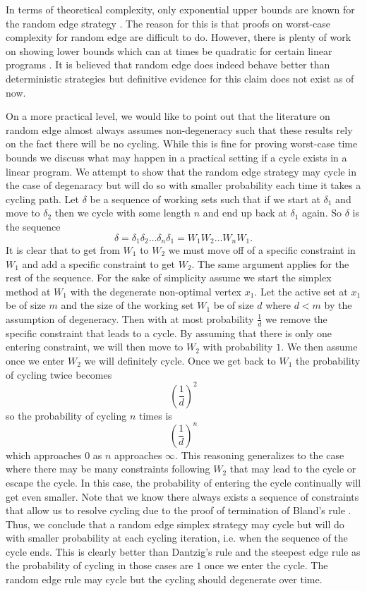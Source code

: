 \documentclass{standalone}
\begin{document}
{  In terms of theoretical complexity, only exponential upper bounds are known for the random edge strategy \cite{hansen2014improved} \cite{gartner2007two}. The reason for this is that proofs on worst-case complexity for random edge are difficult to do. However, there is plenty of work on showing lower bounds which can at times be quadratic for certain linear programs \cite{hansen2014improved}. It is believed that random edge does indeed behave better than deterministic strategies but definitive evidence for this claim does not exist as of now.\par
  On a more practical level, we would like to point out that the literature on random edge almost always assumes non-degeneracy such that these results rely on the fact there will be no cycling. While this is fine for proving worst-case time bounds we discuss what may happen in a practical setting if a cycle exists in a linear program. We attempt to show that the random edge strategy may cycle in the case of degenaracy but will do so with smaller probability each time it takes a cycling path. Let $\delta$ be a sequence of working sets such that if we start at $\delta_{1}$ and move to $\delta_{2}$ then we cycle with some length $n$ and end up back at $\delta_{1}$ again. So $\delta$ is the sequence
  \[
    \delta=\delta_{1}\delta_{2}\dots\delta_{n}\delta_{1}=W_{1}W_{2}\dots W_{n}W_{1}.
  \]
  It is clear that to get from $W_{1}$ to $W_{2}$ we must move off of a specific constraint in $W_{1}$ and add a specific constraint to get $W_{2}$. The same argument applies for the rest of the sequence. For the sake of simplicity assume we start the simplex method at $W_{1}$ with the degenerate non-optimal vertex $x_{1}$. Let the active set at $x_{1}$ be of size $m$ and the size of the working set $W_{1}$ be of size $d$ where $d<m$ by the assumption of degeneracy. Then with at most probability $\frac{1}{d}$ we remove the specific constraint that leads to a cycle. By assuming that there is only one entering constraint, we will then move to $W_{2}$ with probability $1$. We then assume once we enter $W_{2}$ we will definitely cycle. Once we get back to $W_{1}$ the probability of cycling twice becomes
  \[
    (\frac{1}{d})^{2}
  \]
  so the probability of cycling $n$ times is
  \[
    (\frac{1}{d})^{n}
  \]
  which approaches $0$ as $n$ approaches $\infty$. This reasoning generalizes to the case where there may be many constraints following $W_{2}$ that may lead to the cycle or escape the cycle. In this case, the probability of entering the cycle continually will get even smaller. Note that we know there always exists a sequence of constraints that allow us to resolve cycling due to the proof of termination of Bland's rule \cite{bland1977new}. Thus, we conclude that a random edge simplex strategy may cycle but will do with smaller probability at each cycling iteration, i.e. when the sequence of the cycle ends. This is clearly better than Dantzig's rule and the steepest edge rule as the probability of cycling in those cases are $1$ once we enter the cycle. The random edge rule may cycle but the cycling should degenerate over time.\par
}
\end{document}

